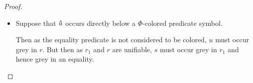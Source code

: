 \documentclass[,%
	draft=false,%
	numbers=noendperiod
	12pt,
	a4paper,
	oneside,%
	openany,
]{memoir}
\begin{document}
\begin{proof}
\begin{itemize}
\begin{itemize}
\begin{itemize}
\begin{itemize}
								\item
									Suppose that $\bm\hat u$ occurs directly below a $\Phi$-colored predicate symbol. 

									Then as the equality predicate is not considered to be colored, $u$ must occur grey in $r$.
									But then as $r_1$ and $r$ are unifiable, $s$ must occur grey in $r_1$ and hence grey in an equality.
									\qedhere
							\end{itemize}

					\end{itemize}

			\end{itemize}

	\end{itemize}

\end{proof}
\end{document}

